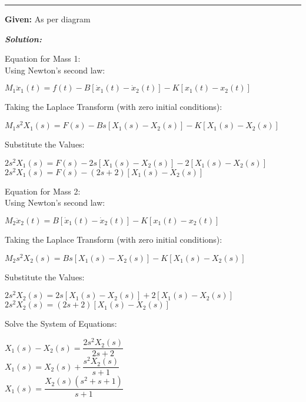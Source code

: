 \documentclass[11pt,letterpaper]{article}
\begin{document}
\rule{\textwidth}{1pt}

\noindent\textbf{Given:} As per diagram

\vspace{12pt}
\noindent\textit{\textbf{Solution:}}

\vspace{12pt}

Equation for Mass 1:\\[12pt]
Using Newton's second law:\\
\begin{center}
	$M_1\ddot{x}_1(t)=f(t)-B[\dot{x}_1(t)-\dot{x}_2(t)]-K[x_1(t)-x_2(t)]$\\
\end{center}
Taking the Laplace Transform (with zero initial conditions):\\
\begin{center}
	$M_1s^2X_1(s)=F(s)-Bs[X_1(s)-X_2(s)]-K[X_1(s)-X_2(s)]$\\
\end{center}
Substitute the Values:\\
\begin{center}
	$2s^2X_1(s)=F(s)-2s[X_1(s)-X_2(s)]-2[X_1(s)-X_2(s)]$\\[12pt]
	$2s^2X_1(s)=F(s)-(2s+2)[X_1(s)-X_2(s)]$\\[12pt]
\end{center}
Equation for Mass 2:\\[12pt]
Using Newton's second law:\\
\begin{center}
	$M_2\ddot{x}_2(t)=B[\dot{x}_1(t)-\dot{x}_2(t)]-K[x_1(t)-x_2(t)]$\\
\end{center}
Taking the Laplace Transform (with zero initial conditions):\\
\begin{center}
	$M_2s^2X_2(s)=Bs[X_1(s)-X_2(s)]-K[X_1(s)-X_2(s)]$\\
\end{center}
Substitute the Values:\\
\begin{center}
	$2s^2X_2(s)=2s[X_1(s)-X_2(s)]+2[X_1(s)-X_2(s)]$\\[12pt]
	$2s^2X_2(s)=(2s+2)[X_1(s)-X_2(s)]$\\[12pt]
\end{center}
Solve the System of Equations:\\
\begin{center}
	$X_1(s)-X_2(s)=\dfrac{2s^2X_2(s)}{2s+2}$\\[12pt]
	$X_1(s)=X_2(s)+\dfrac{s^2X_2(s)}{s+1}$\\[12pt]
	$X_1(s)=\dfrac{X_2(s)(s^2+s+1)}{s+1}$\\[12pt]
\end{center}
\end{document}
